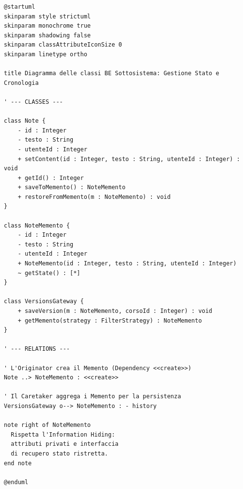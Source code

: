 



\begin{verbatim}
@startuml
skinparam style strictuml
skinparam monochrome true
skinparam shadowing false
skinparam classAttributeIconSize 0
skinparam linetype ortho

title Diagramma delle classi BE Sottosistema: Gestione Stato e Cronologia

' --- CLASSES ---

class Note {
    - id : Integer
    - testo : String
    - utenteId : Integer
    + setContent(id : Integer, testo : String, utenteId : Integer) : void
    + getId() : Integer
    + saveToMemento() : NoteMemento
    + restoreFromMemento(m : NoteMemento) : void
}

class NoteMemento {
    - id : Integer
    - testo : String
    - utenteId : Integer
    + NoteMemento(id : Integer, testo : String, utenteId : Integer)
    ~ getState() : [*]
}

class VersionsGateway {
    + saveVersion(m : NoteMemento, corsoId : Integer) : void
    + getMemento(strategy : FilterStrategy) : NoteMemento
}

' --- RELATIONS ---

' L'Originator crea il Memento (Dependency <<create>>)
Note ..> NoteMemento : <<create>>

' Il Caretaker aggrega i Memento per la persistenza
VersionsGateway o--> NoteMemento : - history

note right of NoteMemento
  Rispetta l'Information Hiding:
  attributi privati e interfaccia
  di recupero stato ristretta.
end note

@enduml
\end{verbatim}